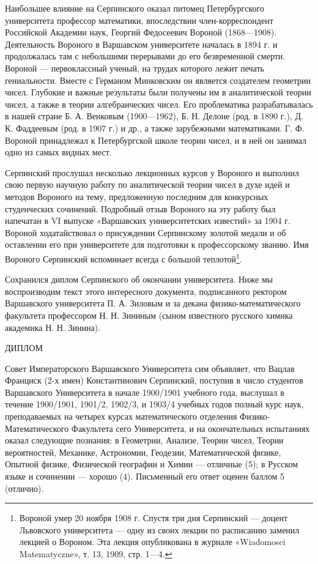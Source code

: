 \documentclass[12pt, a4paper, openany]{book}
\begin{document}
	
	Наибольшее влияние на Серпинского оказал питомец Петербургского университета профессор математики, впоследствии член-корреспондент Российской Академии наук, Георгий Федосеевич Вороной (1868—1908). Деятельность Вороного в Варшавском университете началась в 1894 г. и продолжалась там с небольшими перерывами до его безвременной смерти. Вороной — первоклассный ученый, на трудах которого лежит печать гениальности. Вместе с Германом Минковским он является создателем геометрии чисел. Глубокие и важные результаты были получены им в аналитической теории чисел, а также в теории алгебраических чисел. Его проблематика разрабатывалась в нашей стране Б. А. Венковым (1900—1962), Б. Н. Делоне (род. в 1890 г.), Д. К. Фаддеевым (род. в 1907 г.) и др., а также зарубежными математиками. Г. Ф. Вороной принадлежал к Петербургской школе теории чисел, и в ней он занимал одно из самых видных мест.
	
	Серпинский прослушал несколько лекционных курсов у Вороного и выполнил свою первую научную работу по аналитической теории чисел в духе идей и методов Вороного на тему, предложенную последним для конкурсных студенческих сочинений. Подробный отзыв Вороного на эту работу был напечатан в VI выпуске «Варшавских университетских известий» за 1904 г. Вороной ходатайствовал о присуждении Серпинскому золотой медали и об оставлении его при университете для подготовки к профессорскому званию. Имя Вороного Серпинский вспоминает всегда с большой теплотой\footnote{Вороной умер 20 ноября 1908 г. Спустя три дня Серпинский — доцент Львовского университета — одну из своих лекции по расписанию заменил лекцией о Вороном. Эта лекция опубликована в журнале «Wiadomosci Matematyczne», т. 13, 1909, стр. 1—4.}.
	
	Сохранился диплом Серпинского об окончании университета. Ниже мы воспроизводим текст этого интересного документа, подписанного ректором Варшавского университета П. А. Зиловым и за декана физико-математического факультета профессором Н. Н. Зининым (сыном известного русского химика академика Н. Н. Зинина).
	
	
	\begin{center}
	ДИПЛОМ 
	\end{center}
	
\hangindent=1.5cm   Совет Императорского Варшавского Университета сим объявляет, что Вацлав Франциск (2-х имен) Константинович Серпинский, поступив в число студентов Варшавского Университета в начале 1900/1901 учебного года, выслушал в течение 1900/1901, 1901/2, 1902/3, и 1903/4 учебных годов полный курс наук, преподаваемых на четырех курсах математического отделения Физико-Математического Факультета сего Университета, и на окончательных испытаниях оказал следующие познания: в Геометрии, Анализе, Теории чисел, Теории вероятностей, Механике, Астрономии, Геодезии, Математической физике, Опытной физике, Физической географии и Химии — отличные (5); в Русском языке и сочинении — хорошо (4). Письменный его ответ оценен баллом 5 (отлично).
\end{document}
